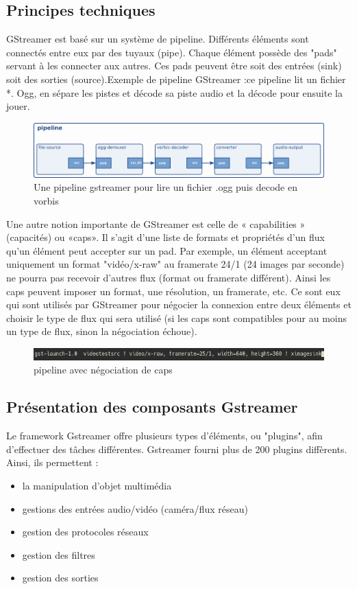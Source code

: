 \subsection{Principes techniques}
\label{principe_gst}
GStreamer est basé sur un système de pipeline. Différents éléments sont connectés entre eux par des tuyaux (pipe). Chaque élément possède des "pads" servant à les connecter aux autres. Ces pads peuvent être soit des entrées (sink) soit des sorties (source).Exemple de pipeline GStreamer :ce pipeline lit un fichier *. Ogg, en sépare les pistes et décode sa piste audio et la décode pour ensuite la jouer.
\begin{figure}[!h]
  \centering
  \includegraphics[scale=0.5]{figures/pipeline_ogg}
  \caption{Une pipeline gstreamer pour lire un fichier .ogg puis decode en vorbis}
\end{figure}

Une autre notion importante de GStreamer est celle de « capabilities » (capacités) ou «caps». Il s'agit d'une liste de formats et propriétés d’un flux qu'un élément peut accepter sur un pad. Par exemple, un élément acceptant uniquement un format "vidéo/x-raw" au framerate 24/1 (24 images par seconde) ne pourra pas recevoir d'autres flux (format ou framerate différent). Ainsi les caps peuvent imposer un format, une résolution, un framerate, etc. Ce sont eux qui sont utilisés par GStreamer pour négocier la connexion entre deux éléments et choisir le type de flux qui sera utilisé (si les caps sont compatibles pour au moins un type de flux, sinon la négociation échoue).

\begin{figure}[!h]
  \centering
  \includegraphics[scale=0.9]{figures/caps_negociation}
  \caption{pipeline avec négociation de caps}
\end{figure}

\subsection{Présentation des composants Gstreamer}
Le framework Gstreamer offre plusieurs types d'éléments, ou "plugins", afin d'effectuer des tâches différentes. Gstreamer fourni plus de 200 plugins diffèrents. Ainsi, ils permettent :\begin{itemize}[label=$\bullet$]
 \item la manipulation d’objet multimédia
 \item gestions des entrées audio/vidéo (caméra/flux réseau)
 \item gestion des protocoles réseaux
 \item gestion des filtres
 \item gestion des sorties
\end{itemize}

